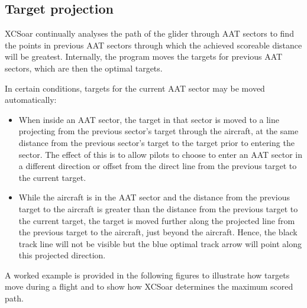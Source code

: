 \subsection*{Target projection}

XCSoar continually analyses the path of the glider through AAT sectors
to find the points in previous AAT sectors through which the achieved
scoreable distance will be greatest.  Internally, the program moves
the targets for previous AAT sectors, which are then the optimal
targets.

In certain conditions, targets for the current AAT sector may be moved
automatically:
\begin{itemize}
\item When inside an AAT sector, the target in that sector is moved
to a line projecting from the previous sector's target through the
aircraft, at the same distance from the previous sector's target to
the target prior to entering the sector.  The effect of this is to
allow pilots to choose to enter an AAT sector in a different direction
or offset from the direct line from the previous target to the current
target.

\item While the aircraft is in the AAT sector and the distance from the
previous target to the aircraft is greater than the distance from the
previous target to the current target, the target is moved further
along the projected line from the previous target to the aircraft,
just beyond the aircraft.  Hence, the black track line will not be
visible but the blue optimal track arrow will point along this
projected direction.
\end{itemize}

A worked example is provided in the following figures to illustrate
how targets move during a flight and to show how XCSoar determines the
maximum scored path.

